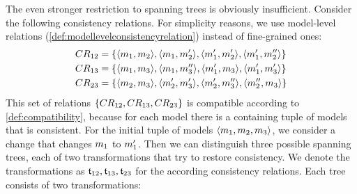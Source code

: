 The even stronger restriction to spanning trees is obviously insufficient.
Consider the following consistency relations. For simplicity reasons, we use model-level relations (\autoref{def:modellevelconsistencyrelation}) instead of fine-grained ones:
\begin{align*}
    & 
    \consistencyrelation{CR}{12} = \setted{\tupled{\model{m}{1}, \model{m}{2}}, \tupled{\model{m}{1}, \model{m}{2}'}, \tupled{\model{m}{1}', \model{m}{2}'}, \tupled{\model{m}{1}', \model{m}{2}''}} \\
    & 
    \consistencyrelation{CR}{13} = \setted{\tupled{\model{m}{1}, \model{m}{3}}, \tupled{\model{m}{1}, \model{m}{3}''}, \tupled{\model{m}{1}', \model{m}{3}}, \tupled{\model{m}{1}', \model{m}{3}'}} \\
    & 
    \consistencyrelation{CR}{23} = \setted{\tupled{\model{m}{2}, \model{m}{3}}, \tupled{\model{m}{2}', \model{m}{3}'}, \tupled{\model{m}{2}', \model{m}{3}''}, \tupled{\model{m}{2}'', \model{m}{3}}} 
\end{align*}
This set of relations $\setted{\consistencyrelation{CR}{12}, \consistencyrelation{CR}{13}, \consistencyrelation{CR}{23}}$ is compatible according to \autoref{def:compatibility}, because for each model there is a containing tuple of models that is consistent.
For the initial tuple of models $\tupled{\model{m}{1}, \model{m}{2}, \model{m}{3}}$, we consider a change that changes $\model{m}{1}$ to $\model{m}{1}'$.
Then we can distinguish three possible spanning trees, each of two transformations that try to restore consistency.
We denote the transformations as $\transformation{t}_{12}, \transformation{t}_{13}, \transformation{t}_{23}$ for the according consistency relations.
Each tree consists of two transformations:
